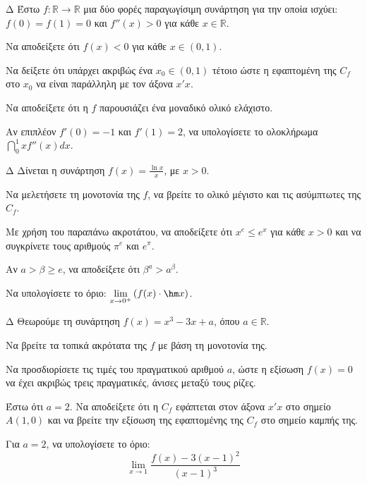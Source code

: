 \begin{thema}{Δ}
Έστω $f: \mathbb{R} \to \mathbb{R}$ μια δύο φορές παραγωγίσιμη συνάρτηση για την οποία ισχύει: $f(0)=f(1)=0$ και $f''(x) > 0$ για κάθε $x \in \mathbb{R}$.
\begin{erwthma}
    \item Να αποδείξετε ότι $f(x) < 0$ για κάθε $x \in (0, 1)$.
    \item Να δείξετε ότι υπάρχει ακριβώς ένα $x_0 \in (0, 1)$ τέτοιο ώστε η εφαπτομένη της $C_f$ στο $x_0$ να είναι παράλληλη με τον άξονα $x'x$.
    \item Να αποδείξετε ότι η $f$ παρουσιάζει ένα μοναδικό ολικό ελάχιστο.
    \item Αν επιπλέον $f'(0)=-1$ και $f'(1)=2$, να υπολογίσετε το ολοκλήρωμα $\dint_0^1 x f''(x) dx$.
\end{erwthma}
\end{thema}

\begin{thema}{Δ}
Δίνεται η συνάρτηση $f(x) = \frac{\ln x}{x}$, με $x > 0$.
\begin{erwthma}
    \item Να μελετήσετε τη μονοτονία της $f$, να βρείτε το ολικό μέγιστο και τις ασύμπτωτες της $C_f$.
    \item Με χρήση του παραπάνω ακροτάτου, να αποδείξετε ότι $x^e \le e^x$ για κάθε $x > 0$ και να συγκρίνετε τους αριθμούς $\pi^e$ και $e^\pi$.
    \item Αν $a > \beta \ge e$, να αποδείξετε ότι $\beta^a > a^\beta$.
    \item Να υπολογίσετε το όριο: $\displaystyle \lim_{x \to 0^+} \left( f(x) \cdot \hm x \right)$.
\end{erwthma}
\end{thema}

\begin{thema}{Δ}
Θεωρούμε τη συνάρτηση $f(x) = x^3 - 3x + a$, όπου $a \in \mathbb{R}$.
\begin{erwthma}
    \item Να βρείτε τα τοπικά ακρότατα της $f$ με βάση τη μονοτονία της.
    \item Να προσδιορίσετε τις τιμές του πραγματικού αριθμού $a$, ώστε η εξίσωση $f(x) = 0$ να έχει ακριβώς τρεις πραγματικές, άνισες μεταξύ τους ρίζες.
    \item Έστω ότι $a=2$. Να αποδείξετε ότι η $C_f$ εφάπτεται στον άξονα $x'x$ στο σημείο $A(1,0)$ και να βρείτε την εξίσωση της εφαπτομένης της $C_f$ στο σημείο καμπής της.
    \item Για $a=2$, να υπολογίσετε το όριο:
    \[ \lim_{x \to 1} \frac{f(x)-3(x-1)^2}{(x-1)^3} \]
\end{erwthma}
\end{thema}

